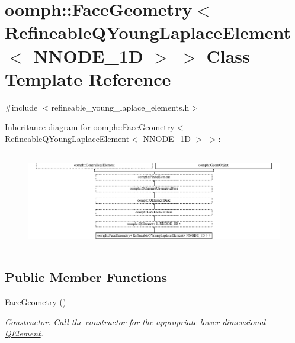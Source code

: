 \hypertarget{classoomph_1_1FaceGeometry_3_01RefineableQYoungLaplaceElement_3_01NNODE__1D_01_4_01_4}{}\section{oomph\+:\+:Face\+Geometry$<$ Refineable\+Q\+Young\+Laplace\+Element$<$ N\+N\+O\+D\+E\+\_\+1D $>$ $>$ Class Template Reference}
\label{classoomph_1_1FaceGeometry_3_01RefineableQYoungLaplaceElement_3_01NNODE__1D_01_4_01_4}


{\ttfamily \#include $<$refineable\+\_\+young\+\_\+laplace\+\_\+elements.\+h$>$}

Inheritance diagram for oomph\+:\+:Face\+Geometry$<$ Refineable\+Q\+Young\+Laplace\+Element$<$ N\+N\+O\+D\+E\+\_\+1D $>$ $>$\+:\begin{figure}[H]
\begin{center}
\leavevmode
\includegraphics[height=4.279476cm]{classoomph_1_1FaceGeometry_3_01RefineableQYoungLaplaceElement_3_01NNODE__1D_01_4_01_4}
\end{center}
\end{figure}
\subsection*{Public Member Functions}
\begin{DoxyCompactItemize}
\item 
\hyperlink{classoomph_1_1FaceGeometry_3_01RefineableQYoungLaplaceElement_3_01NNODE__1D_01_4_01_4_a8f988cb5e431e02b680aba47cd96c9cb}{Face\+Geometry} ()
\begin{DoxyCompactList}\small\item\em Constructor\+: Call the constructor for the appropriate lower-\/dimensional \hyperlink{classoomph_1_1QElement}{Q\+Element}. \end{DoxyCompactList}\end{DoxyCompactItemize}
